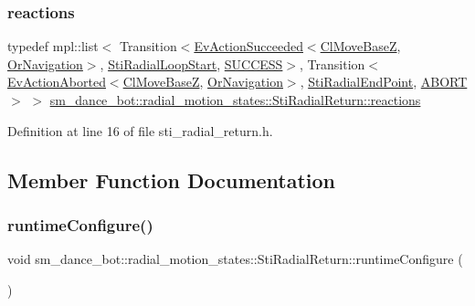 \subsubsection{\texorpdfstring{reactions}{reactions}}
{\footnotesize\ttfamily typedef mpl\+::list$<$ Transition$<$\hyperlink{structsmacc_1_1default__events_1_1EvActionSucceeded}{Ev\+Action\+Succeeded}$<$\hyperlink{classcl__move__base__z_1_1ClMoveBaseZ}{Cl\+Move\+BaseZ}, \hyperlink{classsm__dance__bot_1_1OrNavigation}{Or\+Navigation}$>$, \hyperlink{structsm__dance__bot_1_1radial__motion__states_1_1StiRadialLoopStart}{Sti\+Radial\+Loop\+Start}, \hyperlink{structsmacc_1_1default__transition__tags_1_1SUCCESS}{S\+U\+C\+C\+E\+SS}$>$, Transition$<$\hyperlink{structsmacc_1_1default__events_1_1EvActionAborted}{Ev\+Action\+Aborted}$<$\hyperlink{classcl__move__base__z_1_1ClMoveBaseZ}{Cl\+Move\+BaseZ}, \hyperlink{classsm__dance__bot_1_1OrNavigation}{Or\+Navigation}$>$, \hyperlink{structsm__dance__bot_1_1radial__motion__states_1_1StiRadialEndPoint}{Sti\+Radial\+End\+Point}, \hyperlink{structsmacc_1_1default__transition__tags_1_1ABORT}{A\+B\+O\+RT}$>$ $>$ \hyperlink{structsm__dance__bot_1_1radial__motion__states_1_1StiRadialReturn_a248301e59a9c4f95c9db5349c336ddbc}{sm\+\_\+dance\+\_\+bot\+::radial\+\_\+motion\+\_\+states\+::\+Sti\+Radial\+Return\+::reactions}}



Definition at line 16 of file sti\+\_\+radial\+\_\+return.\+h.



\subsection{Member Function Documentation}
\mbox{\label{structsm__dance__bot_1_1radial__motion__states_1_1StiRadialReturn_a34e0a6de4df8f369424a6be80804a05d}} 
\subsubsection{\texorpdfstring{runtime\+Configure()}{runtimeConfigure()}}
{\footnotesize\ttfamily void sm\+\_\+dance\+\_\+bot\+::radial\+\_\+motion\+\_\+states\+::\+Sti\+Radial\+Return\+::runtime\+Configure (\begin{DoxyParamCaption}{ }\end{DoxyParamCaption})\hspace{0.3cm}{\ttfamily [inline]}}



